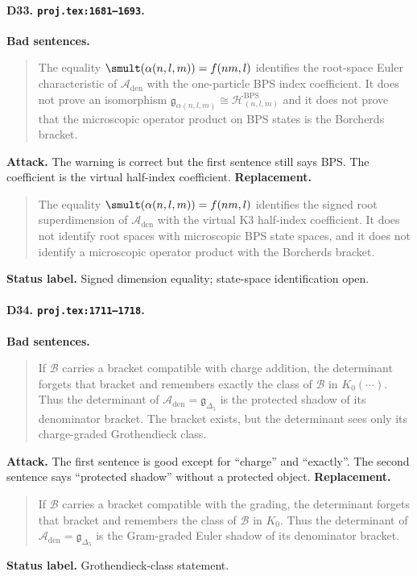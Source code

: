 \paragraph{D33. \texttt{proj.tex:1681--1693}.}
\textbf{Bad sentences.}
\begin{quote}\small
The equality \(\smult(\alpha(n,l,m))=f(nm,l)\) identifies the root-space
Euler characteristic of \(\mathcal A_{\mathrm{den}}\) with the
one-particle BPS index coefficient.  It does not prove an isomorphism
\(\mathfrak g_{\alpha(n,l,m)}\cong
\mathcal H^{\mathrm{BPS}}_{(n,l,m)}\) and it does not prove that the
microscopic operator product on BPS states is the Borcherds bracket.
\end{quote}
\textbf{Attack.}
The warning is correct but the first sentence still says BPS.  The
coefficient is the virtual half-index coefficient.
\textbf{Replacement.}
\begin{quote}\small
The equality \(\smult(\alpha(n,l,m))=f(nm,l)\) identifies the signed
root superdimension of \(\mathcal A_{\mathrm{den}}\) with the virtual K3
half-index coefficient.  It does not identify root spaces with
microscopic BPS state spaces, and it does not identify a microscopic
operator product with the Borcherds bracket.
\end{quote}
\textbf{Status label.} Signed dimension equality; state-space
identification open.

\paragraph{D34. \texttt{proj.tex:1711--1718}.}
\textbf{Bad sentences.}
\begin{quote}\small
If \(\mathcal B\) carries a bracket compatible with charge addition, the
determinant forgets that bracket and remembers exactly the class of
\(\mathcal B\) in \(K_0(\cdots)\).  Thus the determinant of
\(\mathcal A_{\mathrm{den}}=\mathfrak g_{\Delta_5}\) is the protected
shadow of its denominator bracket.  The bracket exists, but the
determinant sees only its charge-graded Grothendieck class.
\end{quote}
\textbf{Attack.}
The first sentence is good except for ``charge'' and ``exactly''.  The
second sentence says ``protected shadow'' without a protected object.
\textbf{Replacement.}
\begin{quote}\small
If \(\mathcal B\) carries a bracket compatible with the grading, the
determinant forgets that bracket and remembers the class of
\(\mathcal B\) in \(K_0\).  Thus the determinant of
\(\mathcal A_{\mathrm{den}}=\mathfrak g_{\Delta_5}\) is the
Gram-graded Euler shadow of its denominator bracket.
\end{quote}
\textbf{Status label.} Grothendieck-class statement.

